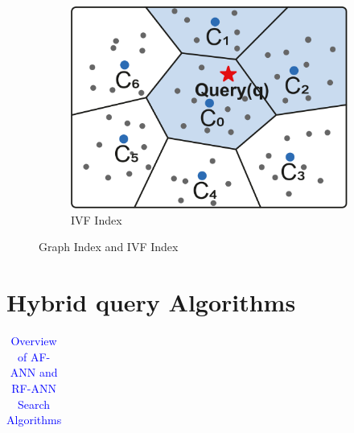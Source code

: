 \documentclass[sigconf, nonacm]{acmart}
\begin{document}
{\begin{figure}
\begin{subfigure}{0.38\columnwidth}
			\includegraphics[width=\linewidth]{figures/ivf.pdf}
			\caption{IVF Index}
			\label{fig:ivf}
		\end{subfigure}
		
		\setlength{\abovecaptionskip}{0.1cm}
		\setlength{\belowcaptionskip}{-0.3cm}		
		\caption{Graph Index and IVF Index}
		
	\end{figure}
	
	
	\section{Hybrid query Algorithms}
	
	
	\renewcommand{\arraystretch}{0.9}
	\begin{table}[t]
		\centering
		\setlength{\abovecaptionskip}{0.15cm}
		\setlength{\belowcaptionskip}{-0.1cm}
		
		\caption{\textcolor{blue}{Overview of AF-ANN and RF-ANN Search Algorithms}}
		\small
%			
%			
	\label{tab:compair_1}
	\begin{tabular}{|l|l|*{12}{c|}}
		\hline
		

\end{tabular}
\end{table}}
\end{document}
